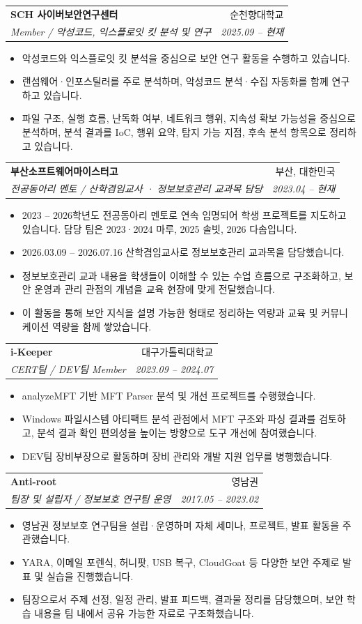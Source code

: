 \documentclass[letterpaper,11pt]{article}
\makeatletter
\newcommand{\resumeItem}[1]{
  \item\small{{#1 \vspace{-2pt}}}
}
\newcommand{\resumeSubheading}[4]{
  \vspace{-1pt}\item
    \begin{tabular*}{0.97\textwidth}[t]{l@{\extracolsep{\fill}}r}
      \textbf{#1} & #2 \\
      \textit{\small#3} & \textit{\small #4} \\
    \end{tabular*}\vspace{-5pt}
}
\newcommand{\resumeItemListStart}{\begin{itemize}[topsep=2pt,parsep=0pt,partopsep=0pt]}
\newcommand{\resumeItemListEnd}{\end{itemize}\vspace{-5pt}}
\makeatother
\begin{document}
    \resumeSubheading
      {SCH 사이버보안연구센터}
      {순천향대학교}
      {Member / 악성코드, 익스플로잇 킷 분석 및 연구}
      {2025.09 -- 현재}
      \resumeItemListStart
        \resumeItem{악성코드와 익스플로잇 킷 분석을 중심으로 보안 연구 활동을 수행하고 있습니다.}
        \resumeItem{랜섬웨어·인포스틸러를 주로 분석하며, 악성코드 분석·수집 자동화를 함께 연구하고 있습니다.}
        \resumeItem{파일 구조, 실행 흐름, 난독화 여부, 네트워크 행위, 지속성 확보 가능성을 중심으로 분석하며, 분석 결과를 IoC, 행위 요약, 탐지 가능 지점, 후속 분석 항목으로 정리하고 있습니다.}
      \resumeItemListEnd

    \resumeSubheading
      {부산소프트웨어마이스터고}
      {부산, 대한민국}
      {전공동아리 멘토 / 산학겸임교사 · 정보보호관리 교과목 담당}
      {2023.04 -- 현재}
      \resumeItemListStart
        \resumeItem{2023 -- 2026학년도 전공동아리 멘토로 연속 임명되어 학생 프로젝트를 지도하고 있습니다. 담당 팀은 2023·2024 마루, 2025 솔빗, 2026 다솜입니다.}
        \resumeItem{2026.03.09 -- 2026.07.16 산학겸임교사로 정보보호관리 교과목을 담당했습니다.}
        \resumeItem{정보보호관리 교과 내용을 학생들이 이해할 수 있는 수업 흐름으로 구조화하고, 보안 운영과 관리 관점의 개념을 교육 현장에 맞게 전달했습니다.}
        \resumeItem{이 활동을 통해 보안 지식을 설명 가능한 형태로 정리하는 역량과 교육 및 커뮤니케이션 역량을 함께 쌓았습니다.}
      \resumeItemListEnd

    \resumeSubheading
      {i-Keeper}
      {대구가톨릭대학교}
      {CERT팀 / DEV팀 Member}
      {2023.09 -- 2024.07}
      \resumeItemListStart
        \resumeItem{analyzeMFT 기반 MFT Parser 분석 및 개선 프로젝트를 수행했습니다.}
        \resumeItem{Windows 파일시스템 아티팩트 분석 관점에서 MFT 구조와 파싱 결과를 검토하고, 분석 결과 확인 편의성을 높이는 방향으로 도구 개선에 참여했습니다.}
        \resumeItem{DEV팀 장비부장으로 활동하며 장비 관리와 개발 지원 업무를 병행했습니다.}
      \resumeItemListEnd

    \resumeSubheading
      {Anti-root}
      {영남권}
      {팀장 및 설립자 / 정보보호 연구팀 운영}
      {2017.05 -- 2023.02}
      \resumeItemListStart
        \resumeItem{영남권 정보보호 연구팀을 설립·운영하며 자체 세미나, 프로젝트, 발표 활동을 주관했습니다.}
        \resumeItem{YARA, 이메일 포렌식, 허니팟, USB 복구, CloudGoat 등 다양한 보안 주제로 발표 및 실습을 진행했습니다.}
        \resumeItem{팀장으로서 주제 선정, 일정 관리, 발표 피드백, 결과물 정리를 담당했으며, 보안 학습 내용을 팀 내에서 공유 가능한 자료로 구조화했습니다.}
      \resumeItemListEnd
\end{document}
